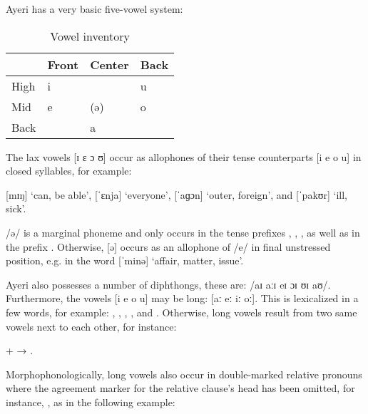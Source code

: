 Ayeri has a very basic five-vowel system:

\begin{table}\centering
\label{tab:vowels}
\caption{Vowel inventory}
\begin{tabu} to .5\textwidth{H X[c] X[c] X[c]}
\toprule\tableheaderfont

	& Front
	& Center
	& Back
	\\

\toprule

High
	& i
	&
	& u
	\\

Mid
	& e
	& (ə)
	& o
	\\

Back
	&
	& a
	&
	\\

\bottomrule
\end{tabu}
\end{table}

The lax vowels [ɪ ɛ ɔ ʊ] occur as allophones of their tense counterparts 
[i e o u] in closed syllables, for example:

\pex
	\a {} [mɪŋ] `can, be able',
	\a {} [ˈɛnja] `everyone',
	\a {} [ˈaɡɔn] `outer, foreign', and
	\a {} [ˈpakʊr] `ill, sick'.
\xe

/ə/ is a marginal phoneme and only occurs in the tense prefixes 
, , , as 
well as in the prefix . Otherwise, [ə] occurs 
as an allophone of /e/ in final unstressed position, e.g. in the word 
 [ˈminə] `affair, matter, issue'.

Ayeri also possesses a number of diphthongs, these are: /aɪ aːɪ eɪ ɔɪ ʊɪ aʊ/.
Furthermore, the vowels [i e o u] may be long: [aː eː iː oː]. This is 
lexicalized in a few words, for example: , 
, , 
, and . Otherwise, long vowels 
result from two same vowels next to each other, for instance:

\ex {} +  → . \xe

Morphophonologically, long vowels also occur in double-marked relative pronouns 
where the agreement marker for the relative clause's head has been omitted,
for instance, , as in the following 
example:


